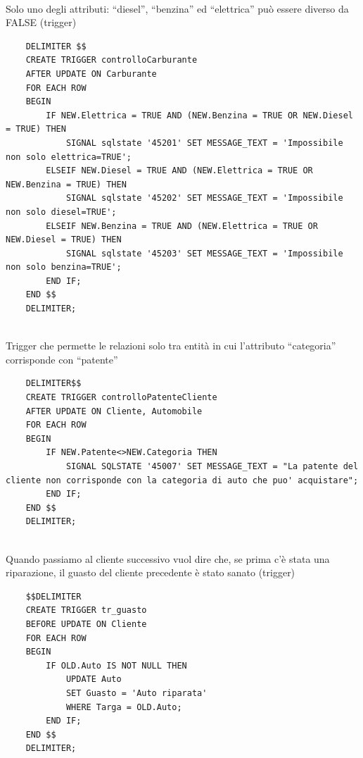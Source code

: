 \documentclass[12pt,a4paper]{article}
\begin{document}
$\,$\\[0.5cm]
Solo uno degli attributi: “diesel”, “benzina” ed “elettrica” può essere diverso da FALSE (trigger)
\begin{lstlisting}
	DELIMITER $$
	CREATE TRIGGER controlloCarburante
	AFTER UPDATE ON Carburante
	FOR EACH ROW
	BEGIN
		IF NEW.Elettrica = TRUE AND (NEW.Benzina = TRUE OR NEW.Diesel = TRUE) THEN
			SIGNAL sqlstate '45201' SET MESSAGE_TEXT = 'Impossibile non solo elettrica=TRUE';
		ELSEIF NEW.Diesel = TRUE AND (NEW.Elettrica = TRUE OR NEW.Benzina = TRUE) THEN
			SIGNAL sqlstate '45202' SET MESSAGE_TEXT = 'Impossibile non solo diesel=TRUE';
		ELSEIF NEW.Benzina = TRUE AND (NEW.Elettrica = TRUE OR NEW.Diesel = TRUE) THEN
			SIGNAL sqlstate '45203' SET MESSAGE_TEXT = 'Impossibile non solo benzina=TRUE';
		END IF;
	END $$
	DELIMITER;
\end{lstlisting}

\pagebreak
$\,$\\[0.5cm]
Trigger che permette le relazioni solo tra entità in cui l’attributo “categoria” corrisponde con “patente”
\begin{lstlisting}
	DELIMITER$$
	CREATE TRIGGER controlloPatenteCliente
	AFTER UPDATE ON Cliente, Automobile
	FOR EACH ROW
	BEGIN
		IF NEW.Patente<>NEW.Categoria THEN
			SIGNAL SQLSTATE '45007' SET MESSAGE_TEXT = "La patente del cliente non corrisponde con la categoria di auto che puo' acquistare";
		END IF;
	END $$
	DELIMITER;
\end{lstlisting}

$\,$\\[0.5cm]
Quando passiamo al cliente successivo vuol dire che, se prima c'è stata una riparazione, il guasto del cliente precedente è stato sanato (trigger)
\begin{lstlisting}
	$$DELIMITER
	CREATE TRIGGER tr_guasto
	BEFORE UPDATE ON Cliente
	FOR EACH ROW
	BEGIN
		IF OLD.Auto IS NOT NULL THEN
			UPDATE Auto
			SET Guasto = 'Auto riparata'
			WHERE Targa = OLD.Auto;
		END IF;
	END $$
	DELIMITER;
	
\end{lstlisting}
\end{document}
